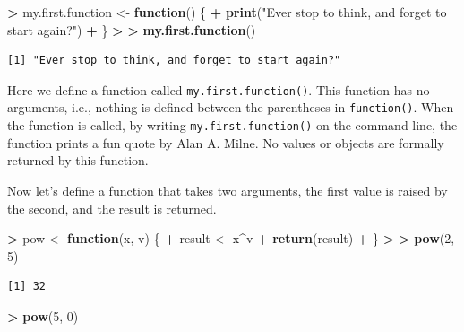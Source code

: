 \documentclass[]{krantz}
\makeatletter
\newenvironment{Shaded}{\begin{snugshade}}{\end{snugshade}}
\newcommand{\KeywordTok}[1]{\textcolor[rgb]{0.27,0.27,0.27}{\textbf{#1}}}
\newcommand{\DecValTok}[1]{\textcolor[rgb]{0.06,0.06,0.06}{#1}}
\newcommand{\StringTok}[1]{\textcolor[rgb]{0.5,0.5,0.5}{#1}}
\newcommand{\ControlFlowTok}[1]{\textcolor[rgb]{0.27,0.27,0.27}{\textbf{#1}}}
\newcommand{\OperatorTok}[1]{\textcolor[rgb]{0.43,0.43,0.43}{\textbf{#1}}}
\newcommand{\ErrorTok}[1]{\textcolor[rgb]{0.14,0.14,0.14}{\textbf{#1}}}
\newcommand{\NormalTok}[1]{#1}
\newenvironment{kframe}{%
\medskip{}
\setlength{\fboxsep}{.8em}
 \def\at@end@of@kframe{}%
 \ifinner\ifhmode%
  \def\at@end@of@kframe{\end{minipage}}%
  \begin{minipage}{\columnwidth}%
 \fi\fi%
 \def\FrameCommand##1{\hskip\@totalleftmargin \hskip-\fboxsep
 \colorbox{shadecolor}{##1}\hskip-\fboxsep
     \hskip-\linewidth \hskip-\@totalleftmargin \hskip\columnwidth}%
 \MakeFramed {\advance\hsize-\width
   \@totalleftmargin\z@ \linewidth\hsize
   \@setminipage}}%
 {\par\unskip\endMakeFramed%
 \at@end@of@kframe}
\renewenvironment{Shaded}{\begin{kframe}}{\end{kframe}}
\theoremstyle{definition}
\theoremstyle{definition}
\theoremstyle{definition}
\theoremstyle{remark}
\makeatother
\begin{document}
\begin{Shaded}
\begin{Highlighting}[]
\OperatorTok{>}\StringTok{ }\NormalTok{my.first.function <-}\StringTok{ }\ControlFlowTok{function}\NormalTok{() \{}
\OperatorTok{+}\StringTok{   }\KeywordTok{print}\NormalTok{(}\StringTok{"Ever stop to think, and forget to start again?"}\NormalTok{)}
\OperatorTok{+}\StringTok{ }\NormalTok{\}}
\OperatorTok{>}\StringTok{ }
\ErrorTok{>}\StringTok{ }\KeywordTok{my.first.function}\NormalTok{()}
\end{Highlighting}
\end{Shaded}

\begin{verbatim}
[1] "Ever stop to think, and forget to start again?"
\end{verbatim}

Here we define a function called \texttt{my.first.function()}. This
function has no arguments, i.e., nothing is defined between the
parentheses in \texttt{function()}. When the function is called, by
writing \texttt{my.first.function()} on the command line, the function
prints a fun quote by Alan A. Milne. No values or objects are formally
returned by this function.

Now let's define a function that takes two arguments, the first value is
raised by the second, and the result is returned.

\begin{Shaded}
\begin{Highlighting}[]
\OperatorTok{>}\StringTok{ }\NormalTok{pow <-}\StringTok{ }\ControlFlowTok{function}\NormalTok{(x, v) \{}
\OperatorTok{+}\StringTok{   }\NormalTok{result <-}\StringTok{ }\NormalTok{x}\OperatorTok{^}\NormalTok{v}
\OperatorTok{+}\StringTok{   }\KeywordTok{return}\NormalTok{(result)}
\OperatorTok{+}\StringTok{ }\NormalTok{\}}
\OperatorTok{>}\StringTok{ }
\ErrorTok{>}\StringTok{ }\KeywordTok{pow}\NormalTok{(}\DecValTok{2}\NormalTok{, }\DecValTok{5}\NormalTok{)}
\end{Highlighting}
\end{Shaded}

\begin{verbatim}
[1] 32
\end{verbatim}

\begin{Shaded}
\begin{Highlighting}[]
\OperatorTok{>}\StringTok{ }\KeywordTok{pow}\NormalTok{(}\DecValTok{5}\NormalTok{, }\DecValTok{0}\NormalTok{)}
\end{Highlighting}
\end{Shaded}
\end{document}

